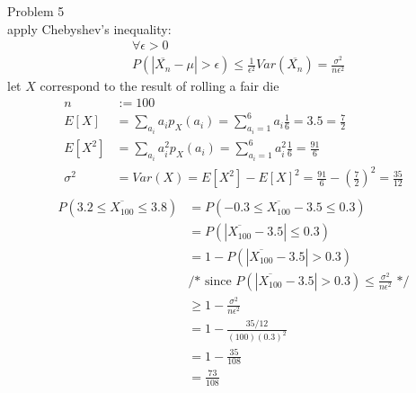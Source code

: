 \documentclass[12pt,border=4pt,multi]{article} %
\begin{document}
\newpage
\noindent
Problem 5\\
apply Chebyshev's inequality:
\begin{align*}
&\forall \epsilon > 0\\
&P(|\overline{X_n} - \mu| > \epsilon) \leq \frac{1}{\epsilon^2} Var(\overline{X_n}) = \frac{\sigma^2}{n\epsilon^2}
\end{align*}
let $X$ correspond to the result of rolling a fair die
\begin{align*}
n &:= 100\\
E[X] &= \sum_{a_i} a_i p_X(a_i) = \sum_{a_i = 1}^6 a_i\frac{1}{6} = 3.5 = \frac{7}{2}\\
E[X^2] &= \sum_{a_i} a_i^2 p_X(a_i) = \sum_{a_i = 1}^6 a_i^2\frac{1}{6} = \frac{91}{6}\\
\sigma^2 &= Var(X) = E[X^2] - E[X]^2 = \frac{91}{6} - \left(\frac{7}{2}\right)^2 = \frac{35}{12}\\
\end{align*}
\begin{align*}
P(3.2 \leq \overline{X_{100}} \leq 3.8) &= P(-0.3 \leq \overline{X_{100}} - 3.5 \leq 0.3)\\
&= P(|\overline{X_{100}} - 3.5| \leq 0.3)\\
&= 1 - P(|\overline{X_{100}} - 3.5| > 0.3)\\
&\text{/* since } P(|\overline{X_{100}} - 3.5| > 0.3) \leq \frac{\sigma^2}{n\epsilon^2} \text{ */}\\
&\geq 1 - \frac{\sigma^2}{n\epsilon^2}\\
&= 1 - \frac{35 / 12}{(100)(0.3)^2}\\
&= 1 - \frac{35}{108}\\
&= \boxed{\frac{73}{108}}\\
\end{align*}
\end{document}
